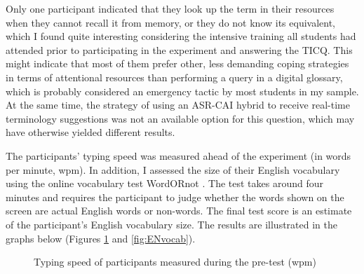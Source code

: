 Only one participant indicated that they look up the term in their resources when they cannot recall it from memory, or they do not know its equivalent, which I found quite interesting considering the intensive training all students had attended prior to participating in the experiment and answering the TICQ. This might indicate that most of them prefer other, less demanding coping strategies in terms of attentional resources than performing a query in a digital glossary, which is probably considered an emergency tactic by most students in my sample. At the same time, the strategy of using an ASR-CAI hybrid to receive real-time terminology suggestions was not an available option for this question, which may have otherwise yielded different results.

 \label{pre-test}
The participants' typing speed was measured ahead of the experiment (in words per minute, wpm). In addition, I assessed the size of their English vocabulary using the online vocabulary test WordORnot \citep{CRR_WON_2014}. The test takes around four minutes and requires the participant to judge whether the words shown on the screen are actual English words or non-words. The final test score is an estimate of the participant's English vocabulary size. The results are illustrated in the graphs below (Figures \ref{fig:typingspeed} and \ref{fig:ENvocab}).

\begin{figure}
\caption[Participants' typing speed]{Typing speed of participants measured during the pre-test (wpm)}
\label{fig:typingspeed}
\end{figure}

